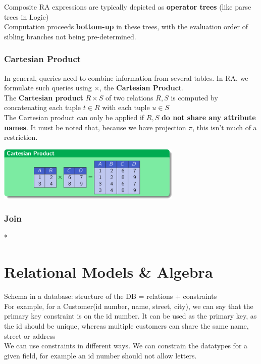 \documentclass{article}
\begin{document}
Composite RA expressions are typically depicted as \textbf{operator trees} (like parse trees in Logic)
\\Computation proceeds \textbf{bottom-up} in these trees, with the evaluation order of sibling branches not being pre-determined.

\subsubsection*{Cartesian Product}
In general, queries need to combine information from several tables. In RA, we formulate such queries using $\times$, the \textbf{Cartesian Product}.
\\The \textbf{Cartesian product} $R \times S$ of two relations $R,S$ is computed by concatenating each tuple $t\in R$ with each tuple $u \in S$
\\The Cartesian product can only be applied if $R, S$ \textbf{do not share any attribute names}. It must be noted that, because we have projection $\pi$, this isn't much of a restriction.
\begin{center}
\includegraphics[width= 250pt]{tex/lecture2/cartesianproduct.png}
\end{center}
\subsubsection{Join}





























\/*
\section*{Relational Models \& Algebra}
Schema in a database: structure of the DB = relations + constraints
\\For example, for a Customer(id number, name, street, city), we can say that the primary key constraint is on the id number. It can be used as the primary key, as the id should be unique, whereas multiple customers can share the same name, street or address
\\We can use constraints in different ways. We can constrain the datatypes for a given field, for example an id number should not allow letters.  
\end{document}

